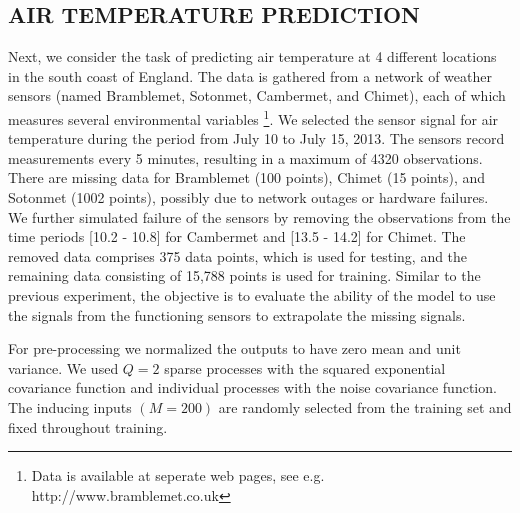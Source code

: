 \subsection{AIR TEMPERATURE PREDICTION}
Next, we consider the task of predicting air temperature at 4 different locations in the south coast of England. 
The data is gathered from a network of weather sensors (named Bramblemet, Sotonmet, Cambermet, and Chimet), each of which measures several environmental variables \citep{osborne2008towards}\footnote{Data is available at seperate web pages, see e.g. http://www.bramblemet.co.uk}.
We selected the sensor signal for air temperature during the period from July 10 to July 15, 2013.
The sensors record measurements every 5 minutes, resulting in a maximum of 4320 observations.
There are missing data for Bramblemet (100 points), Chimet (15 points), and Sotonmet (1002 points), possibly due to network outages or hardware failures.
We further simulated failure of the sensors by removing the observations from the time periods [10.2 - 10.8] for Cambermet and [13.5 - 14.2] for Chimet.
The removed data comprises 375 data points, which is used for testing, and the remaining data consisting of 15,788 points is used for training.
Similar to the previous experiment, the objective is to evaluate the ability of the model to use the signals from the functioning sensors to extrapolate the missing signals.

For pre-processing we normalized the outputs to have zero mean and unit variance.
We used $Q = 2$ sparse processes with the squared exponential covariance function and individual processes with the noise covariance function.
The inducing inputs $(M = 200)$ are randomly selected from the training set and fixed throughout training.

